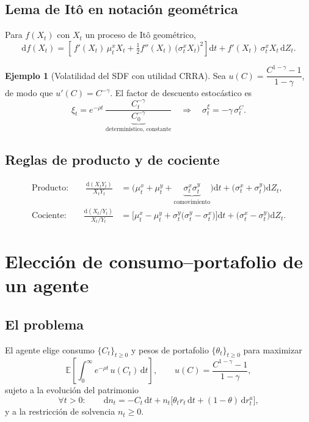 \documentclass[11pt]{article}
\theoremstyle{definition}
\newtheorem{ejemplo}{Ejemplo}[section]
\theoremstyle{remark}
\newcommand{\dd}{\mathrm{d}}
\newcommand{\E}{\mathbb{E}}
\begin{document}
\subsection{Lema de Itô en notación geométrica}

Para $f(X_t)$ con $X_t$ un proceso de Itô geométrico,
\begin{equation}\label{eq:ito-geom}
\dd f(X_t) = \left[\, f'(X_t)\,\mu_t^{x} X_t + \tfrac12 f''(X_t)\,\big(\sigma_t^{x} X_t\big)^2 \right]\dd t
+ f'(X_t)\,\sigma_t^{x} X_t\,\dd Z_t.
\end{equation}

\begin{ejemplo}[Volatilidad del SDF con utilidad CRRA]
Sea $u(C)=\dfrac{C^{1-\gamma}-1}{1-\gamma}$, de modo que $u'(C)=C^{-\gamma}$. El factor de descuento estocástico es
\[
\xi_t = e^{-\rho t}\,\frac{C_t^{-\gamma}}{\underbrace{C_0^{-\gamma}}_{\text{determinístico, constante}}}
\quad\Longrightarrow\quad
\sigma_t^{\xi} = -\gamma\,\sigma_t^{C}.
\]
\end{ejemplo}

\subsection{Reglas de producto y de cociente}

\begin{align}
\text{Producto:}\qquad
\frac{\dd(X_t Y_t)}{X_t Y_t}
&= \big(\mu_t^{x}+\mu_t^{y}+\underbrace{\sigma_t^{x}\sigma_t^{y}}_{\text{comovimiento}}\big)\dd t
+ \big(\sigma_t^{x}+\sigma_t^{y}\big)\dd Z_t, \label{eq:prod}\\[4pt]
\text{Cociente:}\qquad
\frac{\dd(X_t/Y_t)}{X_t/Y_t}
&= \big[\mu_t^{x}-\mu_t^{y}+\sigma_t^{y}\big(\sigma_t^{y}-\sigma_t^{x}\big)\big]\dd t
+ \big(\sigma_t^{x}-\sigma_t^{y}\big)\dd Z_t. \label{eq:coc}
\end{align}

\section{Elección de consumo--portafolio de un agente}

\subsection{El problema}

El agente elige consumo $\{C_t\}_{t\ge0}$ y pesos de portafolio $\{\theta_t\}_{t\ge0}$ para maximizar
\begin{equation}
\E\!\left[\int_0^\infty e^{-\rho t}\,u(C_t)\,\dd t\right],
\qquad u(C)=\frac{C^{1-\gamma}-1}{1-\gamma},
\end{equation}
sujeto a la evolución del patrimonio
\begin{equation}\label{eq:budget}
\forall t>0:\qquad \dd n_t = -C_t\,\dd t + n_t\big[\theta_t r_t\,\dd t + (1-\theta)\,\dd r_t^{a}\big],
\end{equation}
y a la restricción de solvencia $n_t\ge 0$.
\end{document}
